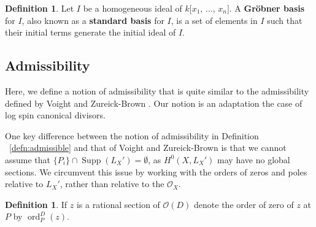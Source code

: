 \documentclass{amsart}
\theoremstyle{plain}
\theoremstyle{definition}
\newtheorem{defn}[thm]{Definition}
\theoremstyle{remark}
\numberwithin{equation}{section}
\newcommand\ssec{\subsection}
\newcommand\sco{{\mathscr O}}
\DeclareMathOperator{\ord}{ord}
\newcommand{\halfcan}{L}
\DeclareMathOperator{\Supp}{Supp}
\begin{document}

\begin{defn}
\label{defn:grobner-basis}
Let $I$ be a homogeneous ideal of $k[x_{1}$, $\ldots$,
$x_{n}]$. A \textbf{Gr\"obner basis} for $I$, also known as a
\textbf{standard basis} for $I$, is a set of elements in $I$
such that their initial terms generate the initial
ideal of $I$.
\end{defn}

\ssec{Admissibility}

Here, we define a notion of admissibility that is quite similar to the admissibility defined by Voight and Zureick-Brown \cite[Definition 8.5.1]{vzb:stacky}. Our notion is an adaptation the case of log spin canonical divisors.

One key difference between the notion of admissibility in Definition ~\ref{defn:admissible} and that of Voight and Zureick-Brown \cite[Definition 8.5.1]{vzb:stacky} is that 
we cannot assume that $\{P_i\} \cap \Supp(L_X') = \emptyset$, as $H^0(X, \halfcan_X')$ may have no global sections. We circumvent this issue by working with the orders of zeros and poles relative to $\halfcan_X'$, rather than relative to the $\sco_X$.

\begin{defn}
\label{def:order-sup}
If $z$ is a rational section of $\sco(D)$ denote the order of
zero of $z$ at $P$ by $\ord_P^D(z)$.
\end{defn}
\end{document}
